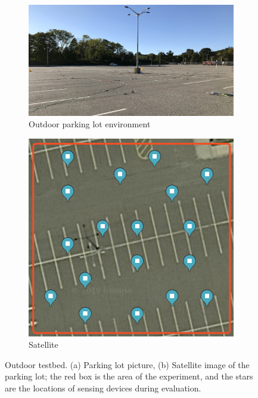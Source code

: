\begin{figure}
	\centering
	\begin{subfigure}[t]{0.585\textwidth}
		\includegraphics[width=\textwidth]{chapters/ipsn/figures/outdoor.jpg}
		\caption{Outdoor parking lot environment}
	\end{subfigure}
	\qquad
	\hspace{-0.15in}
	\begin{subfigure}[t]{0.33\textwidth}
		\includegraphics[width=\textwidth]{chapters/ipsn/figures/outdoor-sate.png}
		\caption{Satellite}
	\end{subfigure}
	\caption{Outdoor testbed. (a) Parking lot picture, (b)
          Satellite image of the parking lot; the red box is the area
          of the experiment, and the stars are the locations of
          sensing devices during evaluation.}
	\label{fig:outdoor}
\end{figure}

